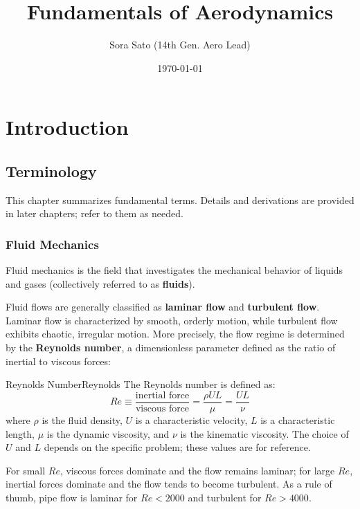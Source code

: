 \documentclass[uplatex,dvipdfmx,a4j,11pt]{report}
\newcommand{\keyword}[1]{\textcolor{mainblue}{\textbf{#1}}}
\numberwithin{equation}{chapter}
\begin{document}
\title{\Huge\textbf{Fundamentals of Aerodynamics}}
\author{Sora Sato (14th Gen. Aero Lead)\footnotemark}
\date{\today}
\maketitle

\tableofcontents


\chapter{Introduction}
\section{Terminology}
This chapter summarizes fundamental terms. Details and derivations are provided in later chapters; refer to them as needed.

\subsection{Fluid Mechanics}
Fluid mechanics is the field that investigates the mechanical behavior of liquids and gases (collectively referred to as \keyword{fluids}).

\enskip

Fluid flows are generally classified as \keyword{laminar flow} and \keyword{turbulent flow}. Laminar flow is characterized by smooth, orderly motion, while turbulent flow exhibits chaotic, irregular motion. More precisely, the flow regime is determined by the \keyword{Reynolds number}, a dimensionless parameter defined as the ratio of inertial to viscous forces:
\begin{definition}{Reynolds Number}{Reynolds}{}
  The Reynolds number is defined as:
  \begin{equation}
    \textit{Re} \equiv \frac{\text{inertial force}}{\text{viscous force}}
    = \frac{\rho UL}{\mu} = \frac{UL}{\nu}
  \end{equation}
  where $\rho$ is the fluid density, $U$ is a characteristic velocity, $L$ is a characteristic length, $\mu$ is the dynamic viscosity, and $\nu$ is the kinematic viscosity. The choice of $U$ and $L$ depends on the specific problem; these values are for reference.
\end{definition}
For small $\textit{Re}$, viscous forces dominate and the flow remains laminar; for large $\textit{Re}$, inertial forces dominate and the flow tends to become turbulent. As a rule of thumb, pipe flow is laminar for $\textit{Re} < 2000$ and turbulent for $\textit{Re} > 4000$.
\end{document}
